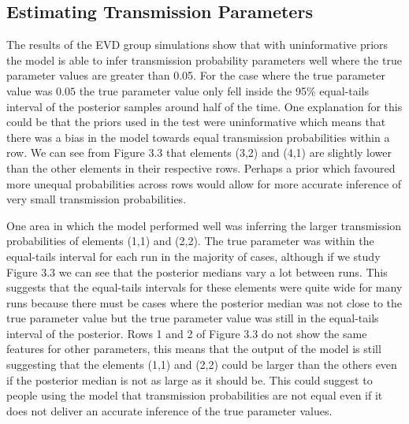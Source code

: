 \documentclass[11pt,a4paper]{report}
\begin{document}
\subsection{Estimating Transmission Parameters}
The results of the EVD group simulations show that with uninformative priors the model is able to infer transmission probability parameters well where the true parameter values are greater than 0.05. For the case where the true parameter value was $0.05$ the true parameter value only fell inside the 95\% equal-tails interval of the posterior samples around half of the time. One explanation for this could be that the priors used in the test were uninformative which means that there was a bias in the model towards equal transmission probabilities within a row. We can see from Figure 3.3 that elements (3,2) and (4,1) are slightly lower than the other elements in their respective rows. Perhaps a prior which favoured more unequal probabilities across rows would allow for more accurate inference of very small transmission probabilities.

One area in which the model performed well was inferring the larger transmission probabilities of elements (1,1) and (2,2). The true parameter was within the equal-tails interval for each run in the majority of cases, although if we study Figure 3.3 we can see that the posterior medians vary a lot between runs. This suggests that the equal-tails intervals for these elements were quite wide for many runs because there must be cases where the posterior median was not close to the true parameter value but the true parameter value was still in the equal-tails interval of the posterior. Rows 1 and 2 of Figure 3.3 do not show the same features for other parameters, this means that the output of the model is still suggesting that the elements (1,1) and (2,2) could be larger than the others even if the posterior median is not as large as it should be. This could suggest to people using the model that transmission probabilities are not equal even if it does not deliver an accurate inference of the true parameter values.
\end{document}
